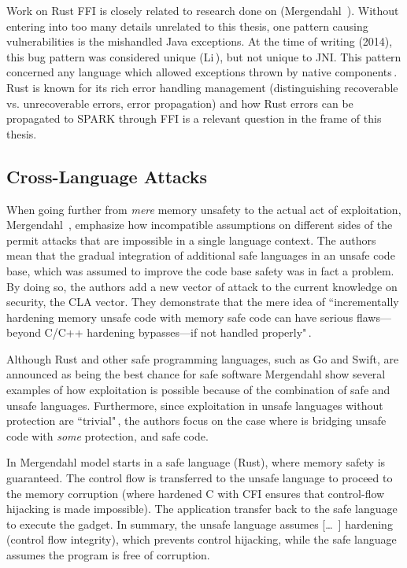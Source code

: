 \documentclass[nomenclature, english, bibtex]{kththesis}
\begin{document}
Work on Rust FFI is closely related to research done on  (Mergendahl \etal\,\cite{mergendahl_cross-language_2022}). Without entering into too many details unrelated to this thesis, one pattern causing vulnerabilities is the mishandled Java exceptions. At the time of writing (2014), this bug pattern was considered unique (Li\,\cite{li_improving_2014}), but not unique to JNI. This pattern concerned any language which allowed exceptions thrown by native components\,\cite{li_improving_2014}. Rust is known for its rich error handling management (distinguishing recoverable vs. unrecoverable errors, error propagation) and how Rust errors can be propagated to SPARK through FFI is a relevant question in the frame of this thesis. 
\subsection{Cross-Language Attacks}

When going further from \emph{mere} memory unsafety to the actual act of exploitation, Mergendahl \etal\,\cite{mergendahl_cross-language_2022}, emphasize how incompatible assumptions on different sides of the  permit attacks that are impossible in a single language context. The authors mean that the gradual integration of additional safe languages in an unsafe code base, which was assumed to improve the code base safety was in fact a problem. By doing so, the authors add a new vector of attack to the current knowledge on security, the \gls{CLA} vector. They demonstrate that the mere idea of ``incrementally hardening memory unsafe code with memory safe code can have serious flaws—beyond C/C++ hardening bypasses—if not handled properly"\,\cite{mergendahl_cross-language_2022}.

Although Rust and other safe programming languages, such as Go and Swift, are announced as being the best chance for safe software Mergendahl \etal show several examples of how exploitation is possible because of the combination of safe and unsafe languages. Furthermore, since exploitation in unsafe languages without protection are ``trivial"\,\cite{mergendahl_cross-language_2022}, the authors focus on the case where   is bridging unsafe code with \textit{some} protection, and safe code. 


In Mergendahl \etal model  starts in a safe language (Rust), where memory safety is guaranteed. The control flow is transferred to the unsafe language to proceed to the memory corruption (where hardened C with \gls{CFI} ensures that control-flow hijacking is made impossible). The application transfer back to the safe language to execute the gadget. In summary, the unsafe language assumes [\ldots\ ] hardening (control flow integrity), which prevents control hijacking, while the safe language assumes the program is free of corruption.
\end{document}
